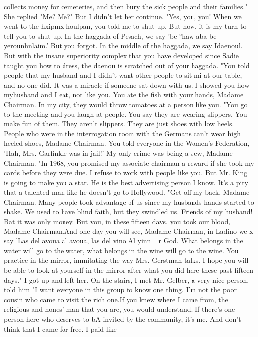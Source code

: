 {collects money for cemeteries, and then bury the sick people and their families." 
She replied "Me? Me?" But I didn't let her continue. 
"Yes, you, you! When we went to the hxipmx houlpan, you told me to shut up. But 
now, it is my turn to tell you to shut up. In the haggada of Pesach, we say 'be 
°haw aba be yerounhnlaim.' But you forgot. In the middle of the haggada, we say 
Idaenoul. But with the insane superiority complex that you have developed since Sadie 
taught you how to dress, the daenou is scratched out of your haggada. 
"You told people that my husband and I didn't want other people to sit mi at our 
table, and no-one did. It was a miracle if someone sat down with us. I showed you 
how myhusband and I eat, not like you. You ate the fish with your hands, Madame 
Chairman. In my city, they would throw tomatoes at a person like you. 
"You go to the meeting and you laugh at people. You say they are wearing slippers. 
You make fun of them. They aren't slippers. They are just shoes with low heels. 
People who were in the interrogation room with the Germans can't wear high heeled shoes, 
Madame Chairman. You told everyone in the Women's Federation, 'Hah, Mrs. Garfinkle 
was in jail!' My only crime was being a Jew, Madame Chairman. 
"In 1968, you promised my associate chairman a reward if she took my cards before 
they were due. I refuse to work with people like you. But Mr. King is going to make 
you a star. He is the best advertising person I know. It's a pity that a talented 
man like he doesn't go to Hollywood. 
"Get off my back, Madame Chairman. Many people took advantage of us since my 
husbands hands started to shake. We used to have blind faith, but they swindled us. 
Friends of my husband! Bat it was only money. But you, in these fifteen days, you 
took our blood, Madame Chairman.And one day you will see, Madame Chairman, in Ladino we x 
say 'Las del avoua al avoua, las del vino Al yinn_ r 
God. What belongs in the water will go to the water, what belongs in the wine will go 
to the wine. You practice in the mirror, immitating the way Mrs. Gerstman talks. I 
hope you will be able to look at yourself in the mirror after what you did here these 
past fifteen days." 
I got up and left her. On the stairs, I met Mr. Gelber, a very nice person. 
told him "I want everyone in this group to know one thing. I'm not the poor cousin 
who came to visit the rich one.If you knew where I came from, the religious and hones' 
man that you are, you would understand. If there's one person here who deserves to bA 
invited by the community, it's me. And don't think that I came for free. I paid like 
}
